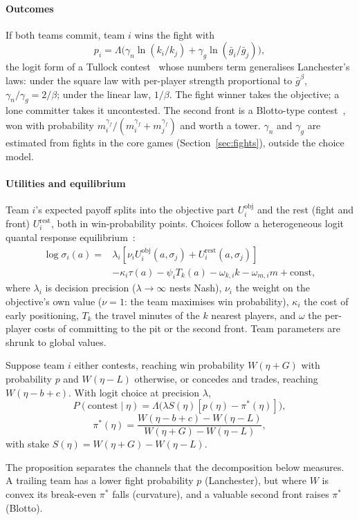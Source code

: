 \paragraph*{Outcomes}
If both teams commit, team $i$ wins the fight with
\begin{equation}
p_i=\Lambda\big(\gamma_n\ln(k_i/k_j)+\gamma_g\ln(\bar g_i/\bar g_j)\big),
\label{eq:tullock}
\end{equation}
the logit form of a Tullock contest~\cite{tullock1980efficient} whose numbers term generalises Lanchester's laws: under the square law with per-player strength proportional to $\bar g^{\beta}$, $\gamma_n/\gamma_g=2/\beta$; under the linear law, $1/\beta$.
The fight winner takes the objective; a lone committer takes it uncontested.
The second front is a Blotto-type contest~\cite{roberson2006colonel}, won with probability $m_i^{\gamma_f}/(m_i^{\gamma_f}+m_j^{\gamma_f})$ and worth a tower.
$\gamma_n$ and $\gamma_g$ are estimated from fights in the core games (Section~\ref{sec:fights}), outside the choice model.

\paragraph*{Utilities and equilibrium}
Team $i$'s expected payoff splits into the objective part $U^{\mathrm{obj}}_i$ and the rest (fight and front) $U^{\mathrm{rest}}_i$, both in win-probability points.
Choices follow a heterogeneous logit quantal response equilibrium~\cite{mckelvey1995quantal}:
\begin{equation}
\begin{split}
\log\sigma_i(a)={}&\lambda_i[\nu_i U^{\mathrm{obj}}_i(a,\sigma_j)+U^{\mathrm{rest}}_i(a,\sigma_j)]\\
&-\kappa_i\tau(a)-\psi_i T_k(a)-\omega_{k,i}k-\omega_{m,i}m+\mathrm{const},
\end{split}
\label{eq:qre}
\end{equation}
where $\lambda_i$ is decision precision ($\lambda\to\infty$ nests Nash), $\nu_i$ the weight on the objective's own value ($\nu=1$: the team maximises win probability), $\kappa_i$ the cost of early positioning, $T_k$ the travel minutes of the $k$ nearest players, and $\omega$ the per-player costs of committing to the pit or the second front.
Team parameters are shrunk to global values.

\begin{proposition}\label{prop:threshold}
Suppose team $i$ either contests, reaching win probability $W(\eta+G)$ with probability $p$ and $W(\eta-L)$ otherwise, or concedes and trades, reaching $W(\eta-b+c)$. With logit choice at precision $\lambda$,
\[
P(\text{contest}\mid\eta)=\Lambda\big(\lambda S(\eta)[p(\eta)-\pi^*(\eta)]\big),
\]
\[
\pi^*(\eta)=\frac{W(\eta-b+c)-W(\eta-L)}{W(\eta+G)-W(\eta-L)},
\]
with stake $S(\eta)=W(\eta+G)-W(\eta-L)$.
\end{proposition}
The proposition separates the channels that the decomposition below measures.
A trailing team has a lower fight probability $p$ (Lanchester), but where $W$ is convex its break-even $\pi^*$ falls (curvature), and a valuable second front raises $\pi^*$ (Blotto).

